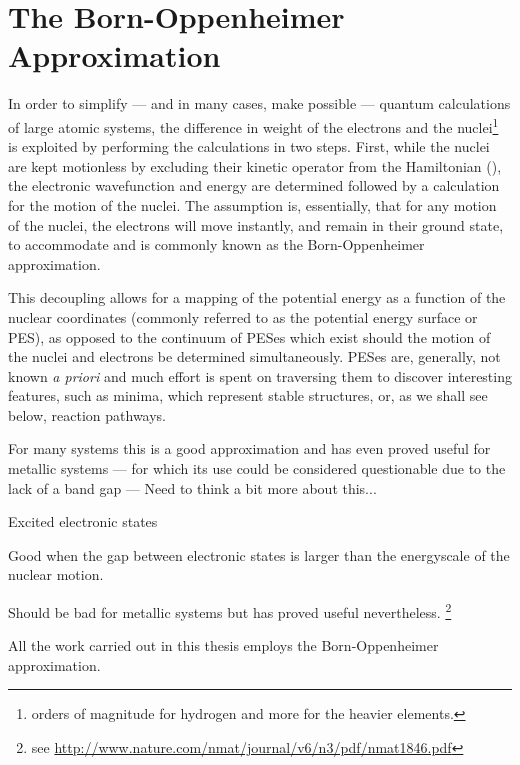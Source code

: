 \section{The Born-Oppenheimer Approximation}
\label{sec:born-oppenheimer}

In order to simplify --- and in many cases, make possible --- quantum calculations of large atomic systems, the difference in weight of the electrons and the nuclei\footnote{ orders of magnitude for hydrogen and more for the heavier elements.} is exploited by performing the calculations in two steps.
First, while the nuclei are kept motionless by excluding their kinetic operator from the Hamiltonian (), the electronic wavefunction and energy are determined followed by a calculation for the motion of the nuclei.
The assumption is, essentially, that for any motion of the nuclei, the electrons will move instantly, and remain in their ground state, to accommodate and is commonly known as the Born-Oppenheimer approximation\cite{born-oppenheimer-1927}.


This decoupling allows for a mapping of the potential energy as a function of the nuclear coordinates (commonly referred to as the potential energy surface or PES), as opposed to the continuum of PESes which exist should the motion of the nuclei and electrons be determined simultaneously.
PESes are, generally, not known \textit{a priori} and much effort is spent on traversing them to discover interesting features, such as minima, which represent stable structures, or, as we shall see below, reaction pathways.

For many systems this is a good approximation and has even proved useful for metallic systems --- for which its use could be considered questionable due to the lack of a band gap --- \expand Need to think a bit more about this...

\bit
\item Excited electronic states
\item Good when the gap between electronic states is larger than the energyscale of the nuclear motion.
\item Should be bad for metallic systems but has proved useful nevertheless. \footnote{see \url{http://www.nature.com/nmat/journal/v6/n3/pdf/nmat1846.pdf}}
\eit

All the work carried out in this thesis employs the Born-Oppenheimer approximation.
